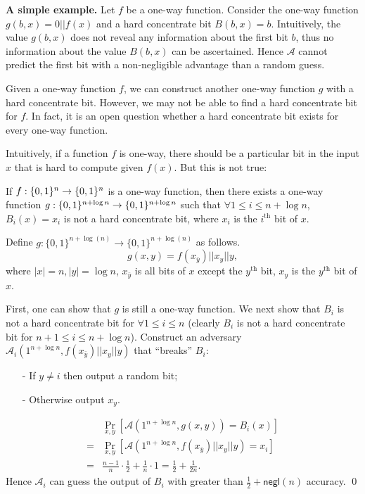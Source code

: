 \noindent\textbf{A simple example.}
Let $f$ be a one-way function. Consider the one-way function $g(b, x) = 0 || f(x)$ and a hard concentrate bit $B(b, x) = b$.
Intuitively, the value $g(b, x)$ does not reveal any information about the first bit $b$, thus no information about the value $B(b, x)$ can be ascertained. Hence $\mathcal{A}$ cannot predict the first bit with a non-negligible advantage than a random guess.
\begin{remark}
Given a one-way function $f$, we can construct another one-way function $g$ with a hard concentrate bit. However, we may not be able to find a hard concentrate bit for $f$. In fact, it is an open question whether a hard concentrate bit exists for every one-way function.
\end{remark}


\bigskip
Intuitively, if a function $f$ is one-way, there should be a particular bit in the input $x$ that is hard to compute given $f(x)$. But this is not true:
\begin{claim}
If $f:\{0,1\}^{n}\rightarrow \{0,1\}^{n}$ is a one-way function, then there exists a one-way function $g:\{0,1\}^{n+\log n}\rightarrow\{0,1\}^{n+\log n}$ such that $\forall 1 \leq i \leq n+\log n$, $B_i(x) = x_i$ is not a hard concentrate bit, where $x_i$ is the $i^\text{th}$ bit of $x$.
\end{claim}
\proof
Define $g:\{0,1\}^{n+\log(n)} \rightarrow \{0,1\}^{n+\log(n)}$ as follows.
$$g(x,y) = f(x_{\bar y}) || x_y || y,$$
where $|x| = n, |y| = \log n$, $x_{\bar y}$ is all bits of $x$ except the $y^\text{th}$ bit, $x_y$ is the $y^\text{th}$ bit of $x$.

First, one can show that $g$ is still a one-way function. 
We next show that $B_i$ is not a hard concentrate bit for $\forall 1 \leq i \leq n$ (clearly $B_i$ is not a hard concentrate bit for $n+1 \leq i \leq n+\log n$).
Construct an adversary $\mathcal{A}_i(1^{n+\log n}, f(x_{\bar y}) || x_y || y)$ that ``breaks'' $B_i$:
\begin{itemize}
\item[-] If $y \not= i$ then output a random bit;
\item[-] Otherwise output $x_y$.
\end{itemize}
\begin{align*}
& \Pr_{x, y}[\mathcal{A}(1^{n+\log n}, g(x,y)) = B_i(x)]\\
=& \Pr_{x, y}[\mathcal{A}(1^{n+\log n}, f(x_{\bar y}) || x_y || y) = x_i]\\
=& \frac{n-1}{n} \cdot \frac{1}{2} + \frac{1}{n} \cdot 1 = \frac{1}{2} + \frac{1}{2n}.
\end{align*}
Hence $\mathcal{A}_i$ can guess the output of $B_i$ with greater than $\frac{1}{2} + \mathsf{negl}(n)$ accuracy.
\qed

